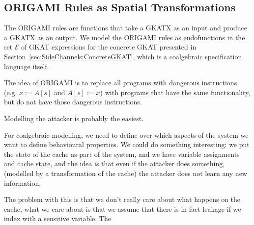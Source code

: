 \subsection{ORIGAMI Rules as Spatial Transformations}
The ORIGAMI rules are functions that take a GKATX as an input and produce a GKATX as an output. We model the ORIGAMI rules as endofunctions in the set $\mathcal{E}$ of GKAT expressions for the concrete GKAT presented in Section~\ref{sec:SideChannels:ConcreteGKAT}, which is a coalgebraic specification language itself. 

The idea of ORIGAMI is to replace all programs with dangerous instructions (e.g. $x:=A[s]$ and $A[s]:=x$) with programs that have the same functionality, but do not have those dangerous instructions. 

 Modelling the attacker is probably the easiest.

For coalgebraic modelling, we need to define over which aspects of the system we want to define behavioural properties. We could do something interesting: we put the state of the cache as part of the system, and we have variable assignments and cache state, and the idea is that even if the attacker does something, (modelled by a transformation of the cache) the attacker does not learn any new information. 

The problem with this is that we don't really care about what happens on the cache, what we care about is that we assume that there is in fact leakage if we index with a sensitive variable. The 




